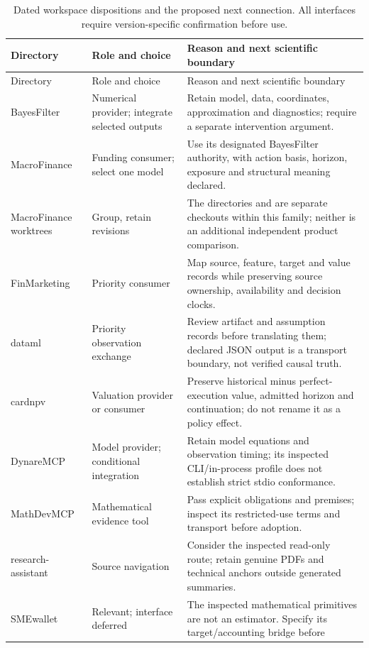 \begin{longtable}{P{.21\linewidth}P{.23\linewidth}P{.47\linewidth}}
\caption{Dated workspace dispositions and the proposed next connection.
All interfaces require version-specific confirmation before use.}
\label{exec13:i3-workspace}\\
\toprule Directory & Role and choice & Reason and next scientific boundary \\
\midrule\endfirsthead
\toprule Directory & Role and choice & Reason and next scientific boundary \\
\midrule\endhead
BayesFilter & Numerical provider; integrate selected outputs & Retain model,
data, coordinates, approximation and diagnostics; require a separate
intervention argument. \\
MacroFinance & Funding consumer; select one model & Use its designated
BayesFilter authority, with action basis, horizon, exposure and structural
meaning declared. \\
MacroFinance worktrees & Group, retain revisions & The directories
 and
 are separate checkouts within this family;
neither is an additional independent product comparison. \\
FinMarketing & Priority consumer & Map source, feature, target and value
records while preserving source ownership, availability and decision clocks. \\
dataml & Priority observation exchange & Review artifact and assumption
records before translating them; declared JSON output is a transport boundary,
not verified causal truth. \\
cardnpv & Valuation provider or consumer & Preserve historical minus
perfect-execution value, admitted horizon and continuation; do not rename it
as a policy effect. \\
DynareMCP & Model provider; conditional integration & Retain model equations
and observation timing; its inspected CLI/in-process profile does not establish
strict stdio conformance. \\
MathDevMCP & Mathematical evidence tool & Pass explicit obligations and
premises; inspect its restricted-use terms and transport before adoption. \\
research-assistant & Source navigation & Consider the inspected read-only
route; retain genuine PDFs and technical anchors outside generated summaries. \\
SMEwallet & Relevant; interface deferred & The inspected mathematical
primitives are not an estimator. Specify its target/accounting bridge before

\end{longtable}
